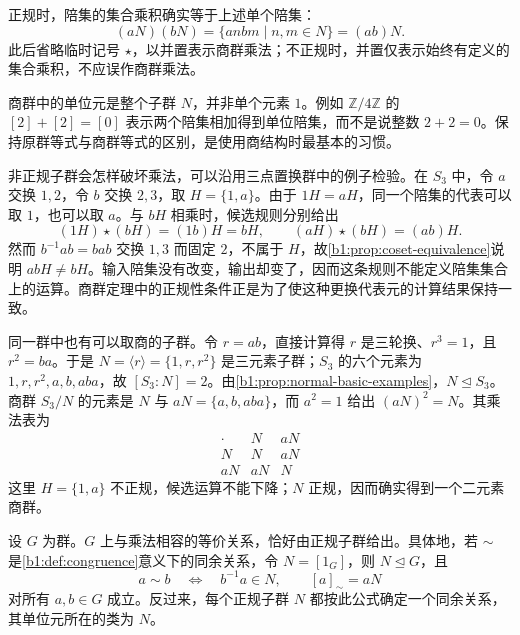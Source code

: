 正规时，陪集的集合乘积确实等于上述单个陪集：
\[
	(aN)(bN)=\{anbm\mid n,m\in N\}=(ab)N.
\]
此后省略临时记号 \(\star\)，以并置表示商群乘法；不正规时，并置仅表示始终有定义的集合乘积，不应误作商群乘法。

\ProseParagraphBreak
商群中的单位元是整个子群 \(N\)，并非单个元素 \(1\)。例如 \(\mathbb Z/4\mathbb Z\) 的 \([2]+[2]=[0]\) 表示两个陪集相加得到单位陪集，而不是说整数 \(2+2=0\)。保持原群等式与商群等式的区别，是使用商结构时最基本的习惯。

\ProseParagraphBreak
非正规子群会怎样破坏乘法，可以沿用三点置换群中的例子检验。在 \(S_3\) 中，令 \(a\) 交换 \(1,2\)，令 \(b\) 交换 \(2,3\)，取 \(H=\{1,a\}\)。由于 \(1H=aH\)，同一个陪集的代表可以取 \(1\)，也可以取 \(a\)。与 \(bH\) 相乘时，候选规则分别给出
\[
	(1H)\star(bH)=(1b)H=bH,\qquad (aH)\star(bH)=(ab)H.
\]
然而 \(b^{-1}ab=bab\) 交换 \(1,3\) 而固定 \(2\)，不属于 \(H\)，故\cref{b1:prop:coset-equivalence}说明 \(abH\neq bH\)。输入陪集没有改变，输出却变了，因而这条规则不能定义陪集集合上的运算。商群定理中的正规性条件正是为了使这种更换代表元的计算结果保持一致。

\ProseParagraphBreak
同一群中也有可以取商的子群。令 \(r=ab\)，直接计算得 \(r\) 是三轮换、\(r^3=1\)，且 \(r^2=ba\)。于是 \(N=\langle r\rangle=\{1,r,r^2\}\) 是三元素子群；\(S_3\) 的六个元素为 \(1,r,r^2,a,b,aba\)，故 \([S_3:N]=2\)。由\cref{b1:prop:normal-basic-examples}，\(N\trianglelefteq S_3\)。商群 \(S_3/N\) 的元素是 \(N\) 与 \(aN=\{a,b,aba\}\)，而 \(a^2=1\) 给出 \((aN)^2=N\)。其乘法表为
\[
	\begin{array}{c|cc}
		\cdot & N & aN\\ \hline N & N & aN\\
		aN & aN & N
	\end{array}
\]
这里 \(H=\{1,a\}\) 不正规，候选运算不能下降；\(N\) 正规，因而确实得到一个二元素商群。

\begin{corollary}[群的同余关系与正规子群]\label{b1:cor:group-congruences}
	设 \(G\) 为群。\(G\) 上与乘法相容的等价关系，恰好由正规子群给出。具体地，若 \(\sim\) 是\cref{b1:def:congruence}意义下的同余关系，令 \(N=[1_G]\)，则 \(N\trianglelefteq G\)，且
	\[
		a\sim b\quad\Longleftrightarrow\quad b^{-1}a\in N, \qquad [a]_{\sim}=aN
	\]
	对所有 \(a,b\in G\) 成立。反过来，每个正规子群 \(N\) 都按此公式确定一个同余关系，其单位元所在的类为 \(N\)。
\end{corollary}


